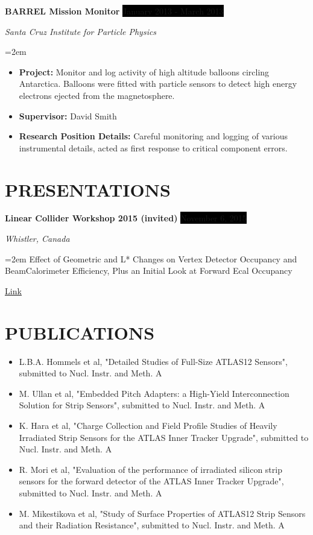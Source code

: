 \documentclass[paper=a4,fontsize=11pt]{scrartcl} %
\newcommand{\sepspace}{\vspace*{1em}}		%
\newcommand{\NewPart}[1]{\section*{\uppercase{#1}}}
\newcommand{\EducationEntry}[4]{
		\noindent \textbf{#1} \hfill      %
		\colorbox{Black}{%
			\parbox{6em}{%
			\hfill\color{White}#2}} \par  %
		\noindent \textit{#3} \par        %
		\noindent\hangindent=2em\hangafter=0 \small #4 %
		\normalsize \par}
\newcommand{\WorkEntry}[4]{				  %
		\noindent \textbf{#1} \hfill      %
		\colorbox{Black}{\color{White}#2} \par  %
		\noindent \textit{#3} \par              %
		\noindent\hangindent=2em\hangafter=0 \small #4 %
		\normalsize \par}
\begin{document}
    \WorkEntry {BARREL Mission Monitor}
        {January 2013 - March 2013}
        {Santa Cruz Institute for Particle Physics}
        {\begin{itemize}
            \item[] \textbf{Project:}
                Monitor and log activity of high altitude balloons circling Antarctica.
                Balloons were fitted with particle sensors to detect high energy electrons
                ejected from the magnetosphere.
            \item[] \textbf{Supervisor:}
                David Smith
            \item[] \textbf{Research Position Details:}
                Careful monitoring and logging of various instrumental details,
                acted as first response to critical component errors.
        \end{itemize}}
    \sepspace


\NewPart{Presentations}{}
    \WorkEntry {Linear Collider Workshop 2015 (invited)} 
        {November 6, 2015}
        {Whistler, Canada}
        {Effect of Geometric and L* Changes on Vertex Detector Occupancy
        and BeamCalorimeter Efficiency, Plus an Initial Look at Forward Ecal
        Occupancy

        \href{https://agenda.linearcollider.org/event/6662/session/39/contribution/205/material/slides/0.pdf} {\underline{Link}}
        }


\NewPart{Publications}
    \begin{itemize}
        \item[] L.B.A. Hommels et al, "Detailed Studies of Full-Size ATLAS12 Sensors", submitted to Nucl. Instr. and Meth. A
        \item[] M. Ullan et al, "Embedded Pitch Adapters: a High-Yield Interconnection Solution for Strip Sensors", submitted to Nucl. Instr. and Meth. A
        \item[] K. Hara et al, "Charge Collection and Field Profile Studies of Heavily Irradiated Strip Sensors for the ATLAS Inner Tracker Upgrade", submitted to Nucl. Instr. and Meth. A
        \item[] R. Mori et al, "Evaluation of the performance of irradiated silicon strip sensors for the forward detector of the ATLAS Inner Tracker Upgrade", submitted to Nucl. Instr. and Meth. A
        \item[] M. Mikestikova et al, "Study of Surface Properties of ATLAS12 Strip Sensors and their Radiation Resistance", submitted to Nucl. Instr. and Meth. A
    \end{itemize}
\end{document}

